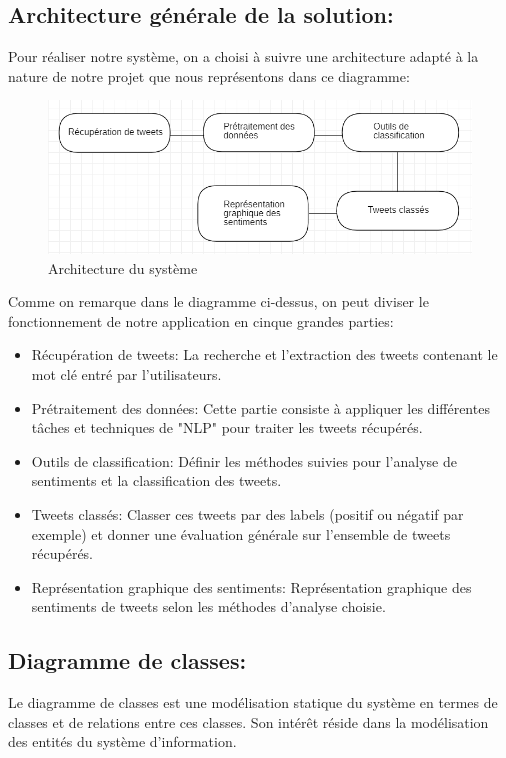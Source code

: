 \subsection{Architecture générale de la solution:}
Pour réaliser notre système, on a choisi à suivre une architecture adapté à la nature de notre projet que nous représentons dans ce diagramme:
\begin{figure}[H]
    \centering
    \includegraphics[width=\textwidth]{chapitre2/assets/architecture.png}
    \caption{Architecture du système}
    \label{fig:my_label}
\end{figure}
Comme on remarque dans le diagramme ci-dessus, on peut diviser le fonctionnement de notre application en cinque grandes parties:
\begin{itemize}
    \item \textcolor{DispositionColor}{Récupération de tweets:} La recherche et l'extraction des tweets contenant le mot clé entré par l'utilisateurs.
    \item \textcolor{DispositionColor}{Prétraitement des données:} Cette partie consiste à appliquer les différentes tâches et techniques de "NLP" pour traiter les tweets récupérés.
    \item \textcolor{DispositionColor}{Outils de classification:} Définir les méthodes suivies pour l'analyse de sentiments et la classification des tweets. 
    \item \textcolor{DispositionColor}{Tweets classés:} Classer ces tweets par des labels (positif ou négatif par exemple) et donner une évaluation générale sur l'ensemble de tweets récupérés.  
    \item \textcolor{DispositionColor}{Représentation graphique des sentiments:} Représentation graphique des sentiments de tweets selon les méthodes d'analyse choisie.
\end{itemize}
\subsection{Diagramme de classes:}
Le diagramme de classes est une modélisation statique du système en termes de classes et
de relations entre ces classes. Son intérêt réside dans la modélisation des entités du
système d'information.\\

